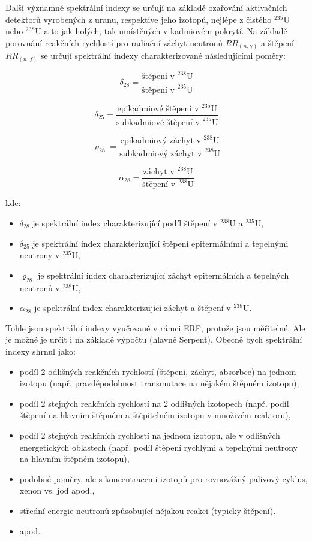 Další významné spektrální indexy se určují na základě ozařování aktivačních detektorů vyrobených z uranu, respektive jeho izotopů, nejlépe z čistého $^{235}\text{U}$ nebo $^{238}\text{U}$ a to jak holých, tak umístěných v kadmiovém pokrytí. Na základě porovnání reakčních rychlostí pro radiační záchyt neutronů $RR_{(n,\gamma)}$ a štěpení $RR_{(n,f)}$ se určují spektrální indexy charakterizované následujícími poměry:

\[
\delta_{28} = \frac{\text{štěpení v } ^{238}\text{U}}{\text{štěpení v } ^{235}\text{U}} 
\]

\[
\delta_{25} = \frac{\text{epikadmiové štěpení v } ^{235}\text{U}}{\text{subkadmiové štěpení v } ^{235}\text{U}}
\]

\[
\varrho_{28} = \frac{\text{epikadmiový záchyt v } ^{238}\text{U}}{\text{subkadmiový záchyt v } ^{238}\text{U}}
\]

\[
\alpha_{28} = \frac{\text{záchyt v } ^{238}\text{U}}{\text{štěpení v } ^{238}\text{U}} 
\]

kde:

\begin{itemize}%
    \item $\delta_{28}$ je spektrální index charakterizující podíl štěpení v $^{238}\text{U}$ a $^{235}\text{U}$,
    \item $\delta_{25}$ je spektrální index charakterizující štěpení epitermálními a tepelnými neutrony v $^{235}\text{U}$,
    \item $\varrho_{28}$ je spektrální index charakterizující záchyt epitermálních a tepelných neutronů v $^{238}\text{U}$,
    \item $\alpha_{28}$ je spektrální index charakterizující záchyt a štěpení v $^{238}\text{U}$.
\end{itemize}

Tohle jsou spektrální indexy vyučované v rámci ERF, protože jsou měřitelné. Ale je možné je určit i na základě výpočtu (hlavně Serpent). Obecně bych spektrální indexy shrnul jako:

\begin{itemize}%
    \item podíl 2 odlišných reakčních rychlostí (štěpení, záchyt, absorbce) na jednom izotopu (např. pravděpodobnost transmutace na nějakém štěpném izotopu),
    \item podíl 2 stejných reakčních rychlostí na 2 odlišných izotopech (např. podíl štěpení na hlavním štěpném a štěpitelném izotopu v množivém reaktoru),
    \item podíl 2 stejných reakčních rychlostí na jednom izotopu, ale v odlišných energetických oblastech (např. podíl štěpení rychlými a tepelnými neutrony na hlavním štěpném izotopu),
    \item podobné poměry, ale s koncentracemi izotopů pro rovnovážný palivový cyklus, xenon vs. jod apod.,
    \item střední energie neutronů způsobující nějakou reakci (typicky štěpení).
    \item apod. 
\end{itemize}

